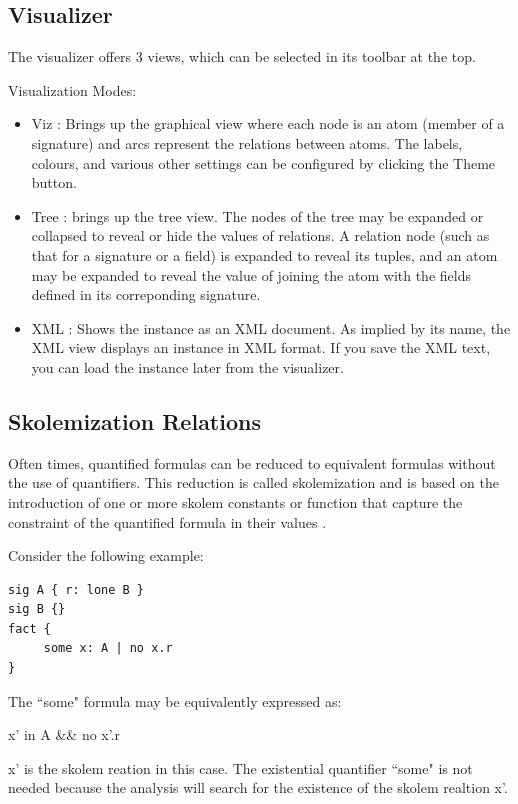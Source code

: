 \documentclass[a4paper,12pt]{report}
\begin{document}
\begin{onehalfspacing}
\subsection{Visualizer} 
\label{visualiser}

The visualizer offers 3 views, which can be selected in its toolbar at the top.

Visualization Modes:
\begin{itemize}
\item Viz : Brings up the graphical view where each node is an atom (member of a signature) and arcs represent the relations between atoms. 
The labels, colours, and various other settings can be configured by clicking the Theme button. 
\item Tree : brings up the tree view. The nodes of the tree may be expanded or collapsed to reveal or hide the values of relations. A relation node (such as that for a signature or a field) is expanded to reveal its tuples, and an atom may be expanded to reveal the value of joining the atom with the fields defined in its correponding signature. 
\item XML : Shows the instance as an XML document. As implied by its name, the XML view displays an instance in XML format. If you save the XML text, you can load the instance later from the visualizer.
\end{itemize}  

\subsection{Skolemization Relations }
\label{Skolemization relations}

Often times, quantified formulas can be reduced to equivalent formulas without the use of quantifiers.
This reduction is called skolemization and is based on the introduction of one or more skolem constants or function that capture the constraint of the quantified formula in their values \cite{DanielJackson2004}.

Consider the following example: 

\begin{verbatim}
sig A { r: lone B } 
sig B {}
fact {
	 some x: A | no x.r
}
\end{verbatim}

 The ``some" formula may be equivalently expressed as: 

    x' in A \&\& no x'.r 
    
x' is the skolem reation in this case. The existential quantifier ``some" is not needed because the analysis will search for the existence of the skolem realtion x'\cite{J.M.Wing1996}.
  

\end{onehalfspacing}
\end{document}
